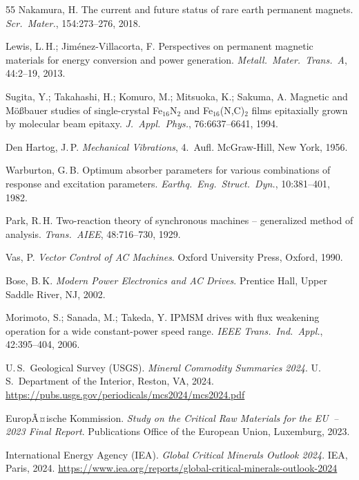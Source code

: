 ﻿\documentclass[12pt, a4paper]{report}
\theoremstyle{definition}
\theoremstyle{remark}
\begin{document}
\begin{thebibliography}{55}
  Nakamura, H.
  The current and future status of rare earth permanent magnets.
  \textit{Scr.\ Mater.}, 154:273--276, 2018.

  Lewis, L.\,H.; Jim\'enez-Villacorta, F.
  Perspectives on permanent magnetic materials for energy conversion
  and power generation.
  \textit{Metall.\ Mater.\ Trans.\ A}, 44:2--19, 2013.

  Sugita, Y.; Takahashi, H.; Komuro, M.; Mitsuoka, K.; Sakuma, A.
  Magnetic and M\"{o}\ss bauer studies of single-crystal Fe$_{16}$N$_2$ and
  Fe$_{16}$(N,C)$_2$ films epitaxially grown by molecular beam epitaxy.
  \textit{J.\ Appl.\ Phys.}, 76:6637--6641, 1994.

  Den Hartog, J.\,P.
  \textit{Mechanical Vibrations}, 4.~Aufl.
  McGraw-Hill, New York, 1956.

  Warburton, G.\,B.
  Optimum absorber parameters for various combinations of response
  and excitation parameters.
  \textit{Earthq.\ Eng.\ Struct.\ Dyn.}, 10:381--401, 1982.

  Park, R.\,H.
  Two-reaction theory of synchronous machines -- generalized method of analysis.
  \textit{Trans.\ AIEE}, 48:716--730, 1929.

  Vas, P.
  \textit{Vector Control of AC Machines}.
  Oxford University Press, Oxford, 1990.

  Bose, B.\,K.
  \textit{Modern Power Electronics and AC Drives}.
  Prentice Hall, Upper Saddle River, NJ, 2002.

  Morimoto, S.; Sanada, M.; Takeda, Y.
  IPMSM drives with flux weakening operation for a wide constant-power speed range.
  \textit{IEEE Trans.\ Ind.\ Appl.}, 42:395--404, 2006.

  U.\,S.\ Geological Survey (USGS).
  \textit{Mineral Commodity Summaries 2024}.
  U.\,S.\ Department of the Interior, Reston, VA, 2024.
  {\small\url{https://pubs.usgs.gov/periodicals/mcs2024/mcs2024.pdf}}

  EuropÃ¤ische Kommission.
  \textit{Study on the Critical Raw Materials for the EU~-- 2023 Final Report}.
  Publications Office of the European Union, Luxemburg, 2023.

  International Energy Agency (IEA).
  \textit{Global Critical Minerals Outlook 2024}.
  IEA, Paris, 2024.
  {\small\url{https://www.iea.org/reports/global-critical-minerals-outlook-2024}}


\end{thebibliography}
\end{document}
